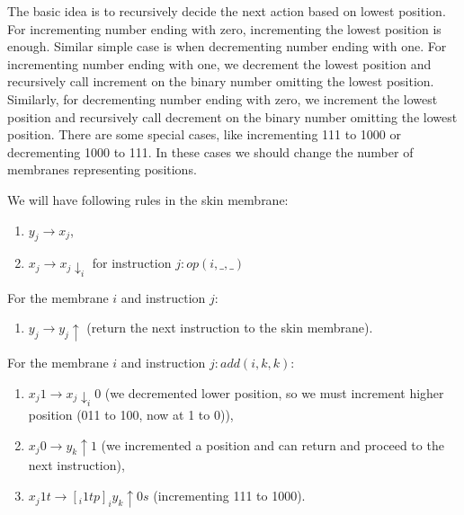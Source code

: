 \documentclass[llncs,submission,copyright,creativecommons]{../lib/lncs/llncs}
\begin{document}
The basic idea is to recursively decide the next action based on lowest position. For incrementing number ending with zero, incrementing the lowest position is enough. Similar simple case is when decrementing number ending with one. For incrementing number ending with one, we decrement the lowest position and recursively call increment on the binary number omitting the lowest position. Similarly, for decrementing number ending with zero, we increment the lowest position and recursively call decrement on the binary number omitting the lowest position.
There are some special cases, like incrementing 111 to 1000 or decrementing 1000 to 111. In these cases we should change the number of membranes representing positions. 

We will have following rules in the skin membrane:
\begin{enumerate}
  \item\label{optim_skin_next_instruction} $y_j \rightarrow x_j$,
  \item\label{optim_skin_send_down} $x_j \rightarrow x_j\downarrow_{i}$ for instruction $j: op(i, \_, \_)$
\end{enumerate}

For the membrane $i$ and instruction $j$:
\begin{enumerate}[resume]
  \item\label{optim_inner_resend_up} $y_j \rightarrow y_j \uparrow$ (return the next instruction to the skin membrane).
\end{enumerate}

For the membrane $i$ and instruction $j: add(i,k,k)$:
\begin{enumerate}[resume]
  \item\label{optim_inner_add_1} $x_j1 \rightarrow x_j\downarrow_{i}0$ (we decremented lower position, so we must increment higher position (011 to 100, now at 1 to 0)),
  \item\label{optim_inner_add_0} $x_j0 \rightarrow y_k \uparrow 1$ (we incremented a position and can return and proceed to the next instruction),
  \item\label{optim_inner_add_1_highest} $x_j1t \rightarrow [_i 1tp]_iy_k\uparrow 0s$ (incrementing 111 to 1000).
\end{enumerate}
\end{document}
